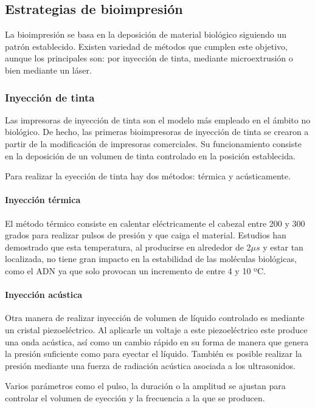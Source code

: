 \documentclass[a4paper,12pt]{article}
\begin{document}
\subsection{Estrategias de bioimpresión}
La bioimpresión se basa en la deposición de material biológico siguiendo un patrón establecido. Existen variedad de métodos que cumplen este objetivo, aunque los principales son: por inyección de tinta, mediante microextrusión o bien mediante un láser.

\subsubsection{Inyección de tinta}
Las impresoras de inyección de tinta son el modelo más empleado en el ámbito no biológico. De hecho, las primeras bioimpresoras de inyección de tinta se crearon a partir de la modificación de impresoras comerciales. Su funcionamiento consiste en la deposición de un volumen de tinta controlado en la posición establecida.

Para realizar la eyección de tinta hay dos métodos: térmica y acústicamente.

\paragraph{Inyección térmica}
El método térmico consiste en calentar eléctricamente el cabezal entre 200 y 300 grados para realizar pulsos de presión y que caiga el material. Estudios han demostrado que esta temperatura, al producirse en alrededor de 2$\mu s$ y estar tan localizada, no tiene gran impacto en la estabilidad de las moléculas biológicas, como el ADN ya que solo provocan un incremento de entre 4 y 10 ºC.


\paragraph{Inyección acústica}
Otra manera de realizar inyección de volumen de líquido controlado es mediante un cristal piezoeléctrico. Al aplicarle un voltaje a este piezoeléctrico este produce una onda acústica, así como un cambio rápido en su forma de manera que genera la presión suficiente como para eyectar el líquido. También es posible realizar la presión mediante una fuerza de radiación acústica asociada a los ultrasonidos.

Varios parámetros como el pulso, la duración o la amplitud se ajustan para controlar el volumen de eyección y la frecuencia a la que se producen.
\end{document}
